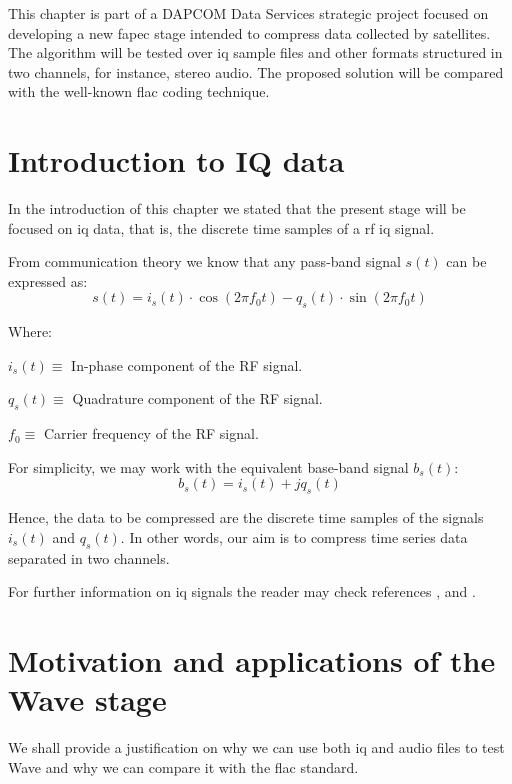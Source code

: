 This chapter is part of a DAPCOM Data Services strategic project focused on developing a new \acrshort{fapec} stage intended to compress data collected by satellites. The algorithm will be tested over \acrshort{iq} sample files and other formats structured in two channels, for instance, stereo audio. The proposed solution will be compared with the well-known \acrshort{flac} coding technique.

\section{Introduction to IQ data} \label{sec:iq_data}
In the introduction of this chapter we stated that the present stage will be focused on \acrshort{iq} data, that is, the discrete time samples of a \acrshort{rf} \acrshort{iq} signal.

From communication theory we know that any pass-band signal $s(t)$ can be expressed as:
\begin{equation}
s(t) = i_s(t) \cdot \cos(2\pi f_0 t) - q_s(t) \cdot \sin(2\pi f_0 t)
\end{equation}

Where:
\begin{description}
	\item $i_s(t) \equiv$ In-phase component of the RF signal.
	\item $q_s(t) \equiv$ Quadrature component of the RF signal.
	\item $f_0 \equiv$ Carrier frequency of the RF signal.
\end{description}

For simplicity, we may work with the equivalent base-band signal $b_s(t)$:
\begin{equation}
	b_s(t) = i_s(t) + j q_s(t)
\end{equation}

Hence, the data to be compressed are the discrete time samples of the signals $i_s(t)$ and $q_s(t)$. In other words, our aim is to compress time series data separated in two channels.

For further information on \acrshort{iq} signals the reader may check references \parencite{IQintro}, \parencite{carlson2010communication} and \parencite{ICOM}.

\section{Motivation and applications of the Wave stage} \label{sec:wave_motivation}
We shall provide a justification on why we can use both \acrshort{iq} and audio files to test Wave and why we can compare it with the \acrshort{flac} standard.

